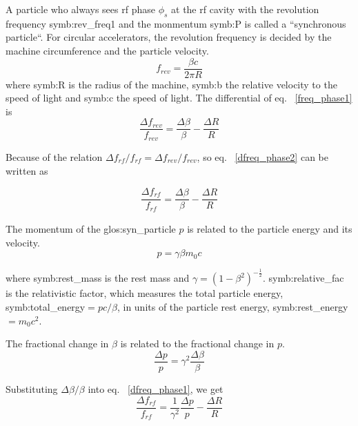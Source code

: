 A particle who always sees rf phase $\phi_\mathit{s}$ at the rf cavity with the revolution frequency \gls{symb:rev_freq1} and the monmentum \gls{symb:P} is called a ``synchronous particle``. For circular accelerators, the revolution frequency is decided by the machine circumference and the particle velocity.
\begin{equation}
f_{\mathit{rev}}=\frac{\beta c}{2\pi R} \label{freq_phase1}
\end{equation}
where \gls{symb:R} is the radius of the machine, \gls{symb:b} the relative velocity to the speed of light and \gls{symb:c} the speed of light. The differential of eq. ~\ref{freq_phase1} is
\begin{equation}
\frac{\Delta f_{\mathit{rev}}}{f_{\mathit{rev}}}=\frac{\Delta\beta}{\beta}-\frac{\Delta R}{R} \label{dfreq_phase2}
\end{equation}

Because of the relation $\Delta f_{\mathit{rf}}/f_{\mathit{rf}}=\Delta f_{\mathit{rev}}/f_{\mathit{rev}}$, so eq.~ \ref{dfreq_phase2} can be written as

\begin{equation}
\frac{\Delta f_{\mathit{rf}}}{f_{\mathit{rf}}}=\frac{\Delta\beta}{\beta}-\frac{\Delta R}{R} \label{dfreq_phase1}
\end{equation}

The momentum of the \gls{glos:syn_particle} $p$ is related to the particle energy and its velocity.  
\begin{equation}
p=\gamma \beta m_0c
\end{equation}

where \gls{symb:rest_mass} is the rest mass and $\gamma=(1-\beta^2)^{-\frac{1}{2}}$. \gls{symb:relative_fac} is the relativistic factor, which measures the total particle energy, \gls{symb:total_energy}$=pc/\beta$, in units of the particle rest energy, \gls{symb:rest_energy}$=m_0c^2$. 


The fractional change in $\beta$ is related to the fractional change in $p$.
\begin{equation}
\label{eq:pv}
\frac{\Delta p}{p}=\gamma^2\frac{\Delta \beta}{\beta}
\end{equation}

Substituting $\Delta \beta/\beta$ into eq. ~\ref{dfreq_phase1}, we get 
\begin{equation}
\frac{\Delta f_{\mathit{rf}}}{f_{\mathit{rf}}}=\frac{1}{\gamma^2}\frac{\Delta p}{p}-\frac{\Delta R}{R}\label{f_p_r1}
\end{equation} 

